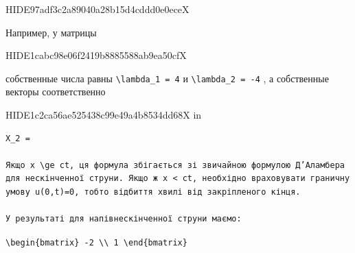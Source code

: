 \documentclass[
  ukrainian,
]{article}
\begin{document}
HIDE97adf3c2a89040a28b15d4cddd0e0eceX

Например, у матрицы

HIDE1cabc98e06f2419b8885588ab9ea50cfX

собственные числа равны \texttt{\textbackslash{}lambda\_1\ =\ 4} и
\texttt{\textbackslash{}lambda\_2\ =\ -4} , а собственные векторы
соответственно

HIDE1c2ca56ae525438c99e49a4b8534dd68X in

\begin{verbatim}
X_2 =

Якщо x \ge ct, ця формула збігається зі звичайною формулою Д’Аламбера для нескінченної струни. Якщо ж x < ct, необхідно враховувати граничну умову u(0,t)=0, тобто відбиття хвилі від закріпленого кінця.

У результаті для напівнескінченної струни маємо:
\end{verbatim}

\texttt{\textbackslash{}begin\{bmatrix\}\ -2\ \textbackslash{}\textbackslash{}\ 1\ \textbackslash{}end\{bmatrix\}}
\end{document}
